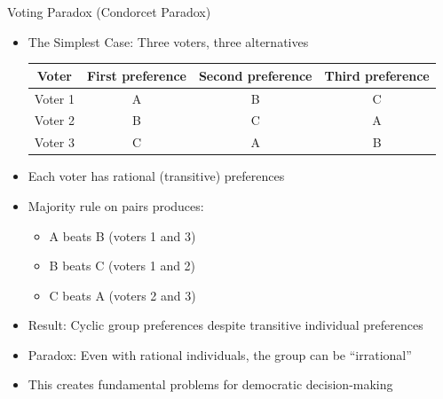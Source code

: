 \documentclass[10pt]{beamer}
\begin{document}
\begin{frame}{Voting Paradox (Condorcet Paradox)}
  \begin{itemize}
    \item The Simplest Case: Three voters, three alternatives
      \begin{table}
        \center
        \begin{tabular}{cccc}
          \toprule
          \textbf{Voter} & \textbf{First preference} & \textbf{Second preference} & \textbf{Third preference} \\
          \midrule
          Voter 1 & A & B & C \\
          Voter 2 & B & C & A \\
          Voter 3 & C & A & B \\
          \bottomrule
        \end{tabular}
      \end{table}
    \item Each voter has rational (transitive) preferences
    \item Majority rule on pairs produces:
      \begin{itemize}
        \item A beats B (voters 1 and 3)
        \item B beats C (voters 1 and 2)
        \item C beats A (voters 2 and 3)
      \end{itemize}
    \item Result: Cyclic group preferences despite transitive individual preferences
    \item Paradox: Even with rational individuals, the group can be ``irrational''
    \item This creates fundamental problems for democratic decision-making
  \end{itemize}
\end{frame}
\end{document}
